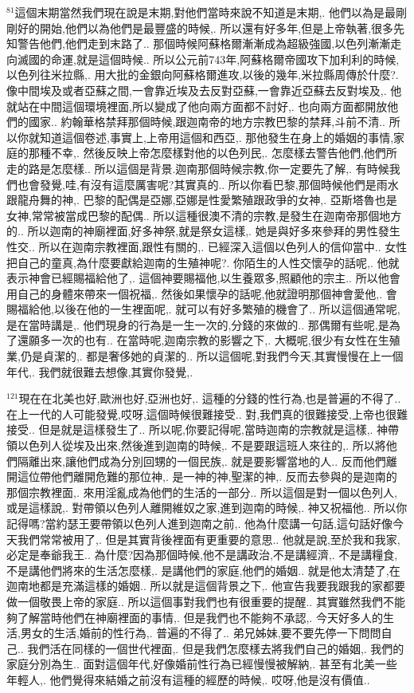 \documentclass{book}
\begin{document}
$^{81}$這個末期當然我們現在說是末期,對他們當時來說不知道是末期,.
他們以為是最剛剛好的開始,他們以為他們是最豐盛的時候,.
所以還有好多年,但是上帝執著,很多先知警告他們,他們走到末路了..
那個時候阿蘇格爾漸漸成為超級強國,以色列漸漸走向滅國的命運,就是這個時候..
所以公元前743年,阿蘇格爾帝國攻下加利利的時候,以色列往米拉縣,.
用大批的金銀向阿蘇格爾進攻,以後的幾年,米拉縣周傳於什麼?.
像中間埃及或者亞蘇之間,一會靠近埃及去反對亞蘇,一會靠近亞蘇去反對埃及,.
他就站在中間這個環境裡面,所以變成了他向兩方面都不討好,.
也向兩方面都開放他們的國家..
約翰華格禁拜那個時候,跟迦南帝的地方宗教巴黎的禁拜,斗前不清..
所以你就知道這個卷述,事實上,上帝用這個和西亞,.
那他發生在身上的婚姻的事情,家庭的那種不幸,.
然後反映上帝怎麼樣對他的以色列民,.
怎麼樣去警告他們,他們所走的路是怎麼樣..
所以這個是背景.迦南那個時候宗教,你一定要先了解,.
有時候我們也會發覺,哇,有沒有這麼厲害呢?其實真的..
所以你看巴黎,那個時候他們是雨水跟龍舟舞的神,.
巴黎的配偶是亞娜,亞娜是性愛繁殖跟政爭的女神,.
亞斯塔魯也是女神,常常被當成巴黎的配偶..
所以這種很澳不清的宗教,是發生在迦南帝那個地方的..
所以迦南的神廟裡面,好多神祭,就是祭女這樣,.
她是與好多來參拜的男性發生性交..
所以在迦南宗教裡面,跟性有關的,.
已經深入這個以色列人的信仰當中..
女性把自己的童真,為什麼要獻給迦南的生殖神呢?.
你陌生的人性交懷孕的話呢,.
他就表示神會已經賜福給他了,.
這個神要賜福他,以生養眾多,照顧他的宗主..
所以他會用自己的身體來帶來一個祝福,.
然後如果懷孕的話呢,他就證明那個神會愛他,.
會賜福給他,以後在他的一生裡面呢,.
就可以有好多繁殖的機會了..
所以這個通常呢,是在當時講是,.
他們現身的行為是一生一次的,分錢的來做的..
那偶爾有些呢,是為了還願多一次的也有..
在當時呢,迦南宗教的影響之下,.
大概呢,很少有女性在生殖業,仍是貞潔的,.
都是奢侈她的貞潔的..
所以這個呢,對我們今天,其實慢慢在上一個年代,.
我們就很難去想像,其實你發覺,.

$^{121}$現在在北美也好,歐洲也好,亞洲也好,.
這種的分錢的性行為,也是普遍的不得了..
在上一代的人可能發覺,哎呀,這個時候很難接受..
對,我們真的很難接受,上帝也很難接受..
但是就是這樣發生了..
所以呢,你要記得呢,當時迦南的宗教就是這樣,.
神帶領以色列人從埃及出來,然後進到迦南的時候,.
不是要跟這班人來往的,.
所以將他們隔離出來,讓他們成為分別回甥的一個民族,.
就是要影響當地的人..
反而他們離開這位帶他們離開危難的那位神,.
是一神的神,聖潔的神,.
反而去參與的是迦南的那個宗教裡面,.
來用淫亂成為他們的生活的一部分..
所以這個是對一個以色列人,或是這樣說,.
對帶領以色列人離開維奴之家,進到迦南的時候,.
神又祝福他..
所以你記得嗎?當約瑟王要帶領以色列人進到迦南之前,.
他為什麼講一句話,這句話好像今天我們常常被用了,.
但是其實背後裡面有更重要的意思..
他就是說,至於我和我家,必定是奉爺我王..
為什麼?因為那個時候,他不是講政治,不是講經濟,.
不是講糧食,不是講他們將來的生活怎麼樣,.
是講他們的家庭,他們的婚姻..
就是他太清楚了,在迦南地都是充滿這樣的婚姻..
所以就是這個背景之下,.
他宣告我要我跟我的家都要做一個敬畏上帝的家庭..
所以這個事對我們也有很重要的提醒..
其實雖然我們不能夠了解當時他們在神廟裡面的事情,.
但是我們也不能夠不承認,.
今天好多人的生活,男女的生活,婚前的性行為,.
普遍的不得了..
弟兄姊妹,要不要先停一下問問自己..
我們活在同樣的一個世代裡面,.
但是我們怎麼樣去將我們自己的婚姻,.
我們的家庭分別為生..
面對這個年代,好像婚前性行為已經慢慢被解納,.
甚至有北美一些年輕人,.
他們覺得來結婚之前沒有這種的經歷的時候,.
哎呀,他是沒有價值..
\end{document}
